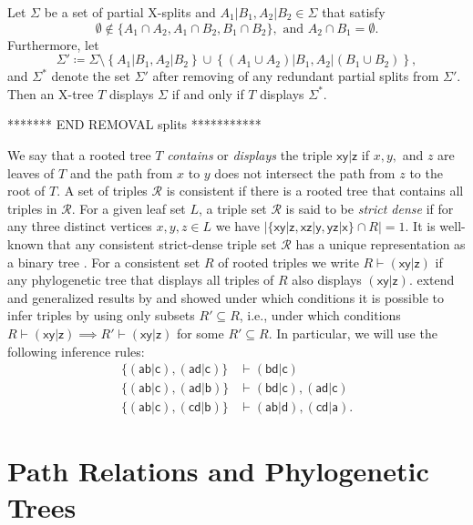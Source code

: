 \documentclass[smallextended]{svjour3}
\let\cite\citep
\newcommand{\rev}[1]{\begingroup\color{blue}#1\endgroup}
\newcommand{\rt}[1]{\ensuremath{\mathsf{#1}}}
\begin{document}
{\begin{lemma}
Let $\Sigma$ be a set of partial X-splits and 
$A_1|B_1, A_2|B_2 \in \Sigma$  that satisfy
\[\emptyset \notin \{A_1 \cap A_2, A_1\cap B_2, B_1 \cap B_2\}, \text{ and } 
A_2 \cap B_1 = \emptyset.\]
Furthermore, let \[\Sigma'\coloneqq \Sigma \setminus 
\left\{A_1|B_1, A_2|B_2\right\} \cup 
\left\{(A_1 \cup A_2)|B_1, A_2 |(B_1 \cup B_2 )\right\}, \]
and $\Sigma^*$ denote the set $\Sigma'$ after
removing of any redundant partial splits from $\Sigma'$.
Then an X-tree $T$ displays $\Sigma$ if and only if $T$ displays $\Sigma^*$.
\label{lem:split-replace}
\end{lemma}

 ******* END REMOVAL splits *********** 	
}

We say that a rooted tree $T$ \emph{contains} or \emph{displays} the triple
$\rt{xy|z}$ if $x,y,$ and $z$ are leaves of $T$ and the path from $x$ to
$y$ does not intersect the path from $z$ to the root of $T$. A set of
triples $\mathcal R$ is consistent if there is a rooted tree that contains
all triples in $\mathcal R$.  For a given leaf set $L$, a triple set
$\mathcal R$ is said to be \emph{strict dense} if for any three distinct
vertices $x,y,z\in L$ we have $|\{\rt{xy|z}, \rt{xz|y}, \rt{yz|x}\}\cap
R|=1$. It is well-known that any consistent strict-dense triple set
$\mathcal R$ has a unique representation as a binary tree
\cite[Suppl. Material]{Hellmuth:15a}.  For a consistent set $R$ of rooted
triples we write $R\vdash \rt{(xy|z)}$ if any phylogenetic tree that
displays all triples of $R$ also displays $\rt{(xy|z)}$.
\rev{\citet{BS:95} extend and generalized results by \citet{Dekker86} and
  showed} under which conditions it is possible to infer triples by using
only subsets $R'\subseteq R$, i.e., under which conditions $R\vdash
\rt{(xy|z)} \implies R'\vdash \rt{(xy|z)}$ for some $R'\subseteq R$. In
particular, we will use the following inference rules:
\renewcommand{\theequation}{\roman{equation}}
\begin{align}
  \{\rt{(ab|c)}, \rt{(ad|c)}\} &\vdash \rt{(bd|c)} 
  \label{eq:infRule1} \\
  \{\rt{(ab|c)}, \rt{(ad|b)}\} & \vdash \rt{(bd|c)},\rt{(ad|c)} 
  \label{eq:infRule2} \\
  \{\rt{(ab|c)}, \rt{(cd|b)}\} &\vdash \rt{(ab|d)},\rt{(cd|a)}.
  \label{eq:infRule3}
\end{align}

\section{Path Relations and Phylogenetic Trees}
\label{sect:theory} 
\end{document}
